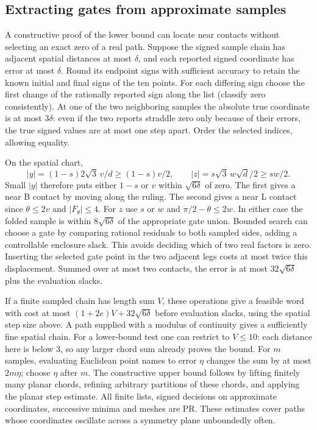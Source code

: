 \documentclass[10pt,letterpaper]{article}
\begin{document}
\subsection*{Extracting gates from approximate samples}
A constructive proof of the lower bound can locate near contacts without selecting an exact zero of a real path. Suppose the signed sample chain has adjacent spatial distances at most $\delta$, and each reported signed coordinate has error at most $\delta$. Round its endpoint signs with sufficient accuracy to retain the known initial and final signs of the ten points. For each differing sign choose the first change of the rationally reported sign along the list (classify zero consistently). At one of the two neighboring samples the absolute true coordinate is at most $3\delta$: even if the two reports straddle zero only because of their errors, the true signed values are at most one step apart. Order the selected indices, allowing equality.
\par On the spatial chart,
\[
 |y|=(1-s)2\sqrt3\,v/d\ge (1-s)v/2,\qquad
 |z|=s\sqrt3\,w\sqrt d/2\ge sw/2 .
\]
Small $|y|$ therefore puts either $1-s$ or $v$ within $\sqrt{6\delta}$ of zero. The first gives a near B contact by moving along the ruling. The second gives a near L contact since $\theta\le2v$ and $|F_\theta|\le4$. For $z$ use $s$ or $w$ and $\pi/2-\theta\le2w$. In either case the folded sample is within $8\sqrt{6\delta}$ of the appropriate gate union. Bounded search can choose a gate by comparing rational residuals to both sampled sides, adding a controllable enclosure slack. This avoids deciding which of two real factors is zero. Inserting the selected gate point in the two adjacent legs costs at most twice this displacement. Summed over at most two contacts, the error is at most $32\sqrt{6\delta}$ plus the evaluation slacks.
\par If a finite sampled chain has length sum $V$, these operations give a feasible word with cost at most $(1+2e)V+32\sqrt{6\delta}$ before evaluation slacks, using the spatial step size above. A path supplied with a modulus of continuity gives a sufficiently fine spatial chain. For a lower-bound test one can restrict to $V\le10$: each distance here is below 3, so any larger chord sum already proves the bound. For $m$ samples, evaluating Euclidean point names to error $\eta$ changes the sum by at most $2m\eta$; choose $\eta$ after $m$. The constructive upper bound follows by lifting finitely many planar chords, refining arbitrary partitions of these chords, and applying the planar step estimate. All finite lists, signed decisions on approximate coordinates, successive minima and meshes are PR. These estimates cover paths whose coordinates oscillate across a symmetry plane unboundedly often.
\end{document}
